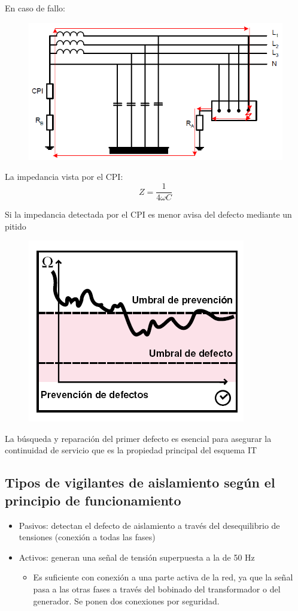 En caso de fallo:
\begin{figure}[H]
	\centering
	\includegraphics[width=0.7\linewidth]{Images/36}
	\label{fig:36}
\end{figure}

La impedancia vista por el CPI:
\begin{equation}
	Z=\dfrac{1}{4 \omega C}
\end{equation}

Si la impedancia detectada por el CPI es menor avisa del defecto mediante un pitido
\begin{figure}[H]
	\centering
	\includegraphics[width=0.4\linewidth]{Images/37}
	\label{fig:37}
\end{figure}

La búsqueda y reparación del primer defecto es esencial para asegurar la
continuidad de servicio que es la propiedad principal del esquema IT
\subsection{Tipos de vigilantes de aislamiento según el principio de funcionamiento}
\begin{itemize}
	\item Pasivos: detectan el defecto de aislamiento a través del desequilibrio de tensiones
	(conexión a todas las fases)
	\item Activos: generan una señal de tensión superpuesta a la de 50 Hz
	\begin{itemize}
		\item Es suficiente con conexión a una parte activa de la
		red, ya que la señal pasa a las otras fases a través
		del bobinado del transformador o del generador. Se
		ponen dos conexiones por seguridad.
	\end{itemize}
\end{itemize}
